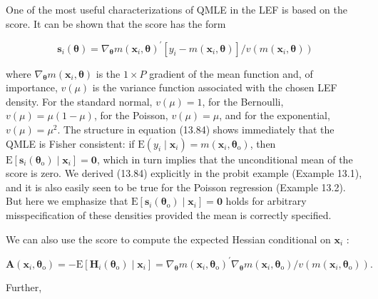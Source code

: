 \documentclass[10pt]{article}
\begin{document}
One of the most useful characterizations of QMLE in the LEF is based on the score. It can be shown that the score has the form


\begin{equation*}
\mathbf{s}_{i}(\boldsymbol{\theta})=\nabla_{\boldsymbol{\theta}} m\left(\mathbf{x}_{i}, \boldsymbol{\theta}\right)^{\prime}\left[y_{i}-m\left(\mathbf{x}_{i}, \boldsymbol{\theta}\right)\right] / v\left(m\left(\mathbf{x}_{i}, \boldsymbol{\theta}\right)\right) \tag{13.84}
\end{equation*}


where $\nabla_{\boldsymbol{\theta}} m\left(\mathbf{x}_{i}, \boldsymbol{\theta}\right)$ is the $1 \times P$ gradient of the mean function and, of importance, $v(\mu)$ is the variance function associated with the chosen LEF density. For the standard normal, $v(\mu)=1$, for the Bernoulli, $v(\mu)=\mu(1-\mu)$, for the Poisson, $v(\mu)=\mu$, and for the exponential, $v(\mu)=\mu^{2}$. The structure in equation (13.84) shows immediately that the QMLE is Fisher consistent: if $\mathrm{E}\left(y_{i} \mid \mathbf{x}_{i}\right)=m\left(\mathbf{x}_{i}, \boldsymbol{\theta}_{\mathrm{o}}\right)$, then $\mathrm{E}\left[\mathbf{s}_{i}\left(\boldsymbol{\theta}_{\mathrm{o}}\right) \mid \mathbf{x}_{i}\right]=\mathbf{0}$, which in turn implies that the unconditional mean of the score is zero. We derived (13.84) explicitly in the probit example (Example 13.1), and it is also easily seen to be true for the Poisson regression (Example 13.2). But here we emphasize that $\mathrm{E}\left[\mathbf{s}_{i}\left(\boldsymbol{\theta}_{\mathrm{o}}\right) \mid \mathbf{x}_{i}\right]=\mathbf{0}$ holds for arbitrary misspecification of these densities provided the mean is correctly specified.

We can also use the score to compute the expected Hessian conditional on $\mathbf{x}_{i}$ :


\begin{equation*}
\mathbf{A}\left(\mathbf{x}_{i}, \boldsymbol{\theta}_{\mathrm{o}}\right)=-\mathrm{E}\left[\mathbf{H}_{i}\left(\boldsymbol{\theta}_{\mathrm{o}}\right) \mid \mathbf{x}_{i}\right]=\nabla_{\boldsymbol{\theta}} m\left(\mathbf{x}_{i}, \boldsymbol{\theta}_{\mathrm{o}}\right)^{\prime} \nabla_{\boldsymbol{\theta}} m\left(\mathbf{x}_{i}, \boldsymbol{\theta}_{\mathrm{o}}\right) / v\left(m\left(\mathbf{x}_{i}, \boldsymbol{\theta}_{\mathrm{o}}\right)\right) . \tag{13.85}
\end{equation*}


Further,
\end{document}
